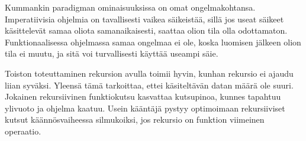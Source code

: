 Kummankin paradigman ominaisuuksissa on omat ongelmakohtansa. Imperatiivisia ohjelmia on tavallisesti vaikea säikeistää, sillä jos useat säikeet käsittelevät samaa oliota samanaikaisesti, saattaa olion tila olla odottamaton. Funktionaalisessa ohjelmassa samaa ongelmaa ei ole, koska luomisen jälkeen olion tila ei muutu, ja sitä voi turvallisesti käyttää useampi säie. 
\cite[Luku 6]{prorgrammingInScala3rd}

Toiston toteuttaminen rekursion avulla toimii hyvin, kunhan rekursio ei ajaudu liian syväksi. Yleensä tämä tarkoittaa, ettei käsiteltävän datan määrä ole suuri. Jokainen rekursiivinen funktiokutsu kasvattaa kutsupinoa, kunnes tapahtuu ylivuoto ja ohjelma kaatuu. Usein kääntäjä pystyy optimoimaan rekursiiviset kutsut käännösvaiheessa silmukoiksi, jos rekursio on funktion viimeinen operaatio.
\cite[Luku 8]{prorgrammingInScala3rd} 
